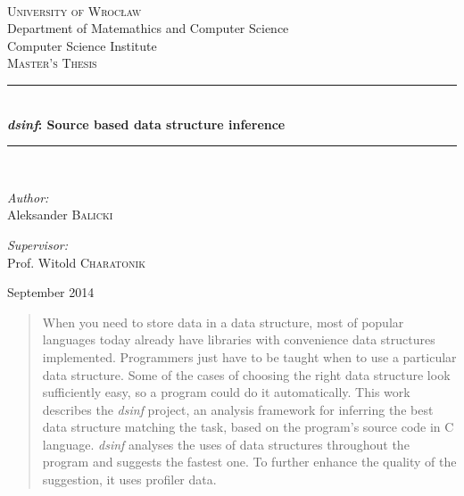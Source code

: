 \documentclass[a4paper,11pt]{article}
\newcommand{\HRule}{\rule{\linewidth}{0.5mm}}
\begin{document}

\begin{titlepage}
\begin{center}

\textsc{\LARGE \\ University of Wrocław} \\
Department of Matemathics and Computer Science \\
Computer Science Institute\\[1.5cm]

\textsc{\Large Master's Thesis}\\[0.5cm]

\HRule \\[0.4cm]
{ \huge \bfseries \emph{dsinf}: Source based data structure inference \\[0.4cm] }

\HRule \\[1.5cm]

\begin{minipage}{0.4\textwidth}
\begin{flushleft} \large
\emph{Author:}\\
Aleksander \textsc{Balicki}
\end{flushleft}
\end{minipage}
\begin{minipage}{0.4\textwidth}
\begin{flushright} \large
\emph{Supervisor:} \\
Prof. Witold \textsc{Charatonik}
\end{flushright}
\end{minipage}

\vfill

{\large September 2014}
\thispagestyle{empty}
\end{center}
\end{titlepage}

\vfill

\pagebreak

\renewcommand{\abstractname}{Abstract}
\begin{abstract}

    When you need to store data in a data structure, most of popular languages
    today already have libraries with convenience data structures implemented.
    Programmers just have to be taught when to use a particular data structure. Some of
    the cases of choosing the right data structure look sufficiently easy, so a
    program could do it automatically. This work describes the \emph{dsinf} project,
    an analysis framework for inferring the best data structure matching the task,
    based on the program's source code in C language. \emph{dsinf} analyses the 
    uses of data structures throughout the program and suggests the fastest one.     
    To further enhance the quality of the suggestion, it uses profiler data.

\end{abstract}
\thispagestyle{empty}
\pagebreak
\end{document}
